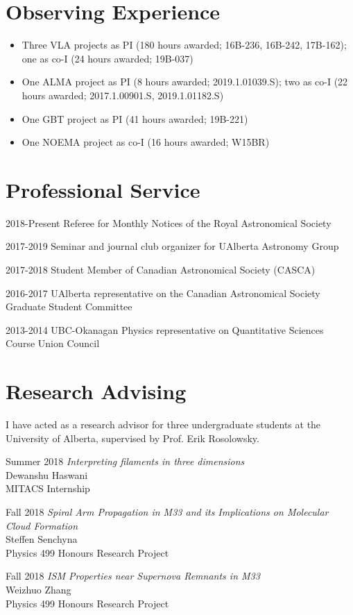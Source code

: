 \documentclass[letterpaper,11pt]{article}
\newlength{\mainindent} \setlength{\mainindent}{12pt}
\newlength{\contentindent} \setlength{\contentindent}{19ex}
\newenvironment{datelist}{
  \begingroup
  \raggedright
  \begin{description}[labelindent=\mainindent,leftmargin=\contentindent,
      style=sameline,font=\normalfont,topsep=0pt,partopsep=0pt,parsep=0pt,
      itemsep=4pt]
}{
  \end{description}
  \endgroup
}
\begin{document}
\section*{Observing Experience}
\begin{itemize}
\item Three VLA projects as PI (180 hours awarded; 16B-236, 16B-242, 17B-162); one as co-I (24 hours awarded; 19B-037)
\item One ALMA project as PI (8 hours awarded; 2019.1.01039.S); two as co-I (22 hours awarded; 2017.1.00901.S, 2019.1.01182.S)
\item One GBT project as PI (41 hours awarded; 19B-221)
\item One NOEMA project as co-I (16 hours awarded; W15BR)
\end{itemize}

\section*{Professional Service}
\begin{datelist}

\item[2018-Present] Referee for Monthly Notices of the Royal Astronomical Society
\item[2017-2019] Seminar and journal club organizer for UAlberta Astronomy Group
\item[2017-2018] Student Member of Canadian Astronomical Society (CASCA)
\item[2016-2017] UAlberta representative on the Canadian Astronomical Society Graduate Student Committee
\item[2013-2014] UBC-Okanagan Physics representative on Quantitative Sciences Course Union Council

\end{datelist}


\section*{Research Advising}

I have acted as a research advisor for three undergraduate students at the University of Alberta, supervised by Prof. Erik Rosolowsky.
\vspace{0.1in}
\begin{datelist}
\item[Summer 2018]
  \emph{Interpreting filaments in three dimensions} \\
  Dewanshu Haswani \\
  MITACS Internship
\item[Fall 2018]
  \emph{Spiral Arm Propagation in M33 and its Implications on Molecular Cloud Formation} \\
  Steffen Senchyna \\
  Physics 499 Honours Research Project
\item[Fall 2018]
  \emph{ISM Properties near Supernova Remnants in M33} \\
  Weizhuo Zhang \\
  Physics 499 Honours Research Project
\end{datelist}
\end{document}
